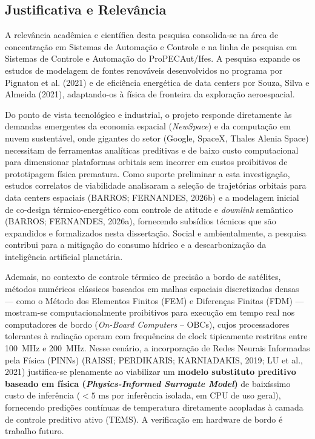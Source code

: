 \subsection{Justificativa e Relevância}

A relevância acadêmica e científica desta pesquisa consolida-se na área de concentração em Sistemas de Automação e Controle e na linha de pesquisa em Sistemas de Controle e Automação do ProPECAut/Ifes. A pesquisa expande os estudos de modelagem de fontes renováveis desenvolvidos no programa por Pignaton et al. (2021) e de eficiência energética de data centers por Souza, Silva e Almeida (2021), adaptando-os à física de fronteira da exploração aeroespacial.

Do ponto de vista tecnológico e industrial, o projeto responde diretamente às demandas emergentes da economia espacial (\textit{NewSpace}) e da computação em nuvem sustentável, onde gigantes do setor (Google, SpaceX, Thales Alenia Space) necessitam de ferramentas analíticas preditivas e de baixo custo computacional para dimensionar plataformas orbitais sem incorrer em custos proibitivos de prototipagem física prematura. Como suporte preliminar a esta investigação, estudos correlatos de viabilidade analisaram a seleção de trajetórias orbitais para data centers espaciais (BARROS; FERNANDES, 2026b) e a modelagem inicial de co-design térmico-energético com controle de atitude e \textit{downlink} semântico (BARROS; FERNANDES, 2026a), fornecendo subsídios técnicos que são expandidos e formalizados nesta dissertação. Social e ambientalmente, a pesquisa contribui para a mitigação do consumo hídrico e a descarbonização da inteligência artificial planetária.

Ademais, no contexto de controle térmico de precisão a bordo de satélites, métodos numéricos clássicos baseados em malhas espaciais discretizadas densas — como o Método dos Elementos Finitos (FEM) e Diferenças Finitas (FDM) — mostram-se computacionalmente proibitivos para execução em tempo real nos computadores de bordo (\textit{On-Board Computers} -- OBCs), cujos processadores tolerantes à radiação operam com frequências de clock tipicamente restritas entre 100~MHz e 200~MHz. Nesse cenário, a incorporação de Redes Neurais Informadas pela Física (PINNs) (RAISSI; PERDIKARIS; KARNIADAKIS, 2019; LU et al., 2021) justifica-se plenamente ao viabilizar um \textbf{modelo substituto preditivo baseado em física (\textit{Physics-Informed Surrogate Model})} de baixíssimo custo de inferência ($< 5\text{ ms}$ por inferência isolada, em CPU de uso geral), fornecendo predições contínuas de temperatura diretamente acopladas à camada de controle preditivo ativo (TEMS). A verificação em hardware de bordo é trabalho futuro.

